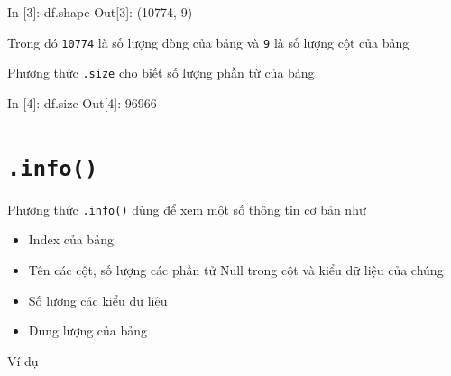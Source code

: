 \documentclass[
]{book}
\newenvironment{Shaded}{\begin{snugshade}}{\end{snugshade}}
\newcommand{\DecValTok}[1]{\textcolor[rgb]{0.00,0.00,0.81}{#1}}
\newcommand{\NormalTok}[1]{#1}
\providecommand{\tightlist}{%
  \setlength{\itemsep}{0pt}\setlength{\parskip}{0pt}}
\begin{document}
\begin{Shaded}
\begin{Highlighting}[]
\NormalTok{In [}\DecValTok{3}\NormalTok{]: df.shape}
\NormalTok{Out[}\DecValTok{3}\NormalTok{]: (}\DecValTok{10774}\NormalTok{, }\DecValTok{9}\NormalTok{)}
\end{Highlighting}
\end{Shaded}

Trong dó \texttt{10774} là số lượng dòng của bảng và \texttt{9} là số lượng cột của bảng

Phương thức \texttt{.size} cho biết số lượng phần từ của bảng

\begin{Shaded}
\begin{Highlighting}[]
\NormalTok{ In [}\DecValTok{4}\NormalTok{]: df.size}
\NormalTok{ Out[}\DecValTok{4}\NormalTok{]: }\DecValTok{96966}
\end{Highlighting}
\end{Shaded}

\hypertarget{info}{%
\section{\texorpdfstring{\texttt{.info()}}{.info()}}\label{info}}

Phương thức \texttt{.info()} dùng để xem một số thông tin cơ bản như

\begin{itemize}
\tightlist
\item
  Index của bảng
\item
  Tên các cột, số lượng các phần tử Null trong cột và kiểu dữ liệu của chúng
\item
  Số lượng các kiểu dữ liệu
\item
  Dung lượng của bảng
\end{itemize}

Ví dụ
\end{document}
